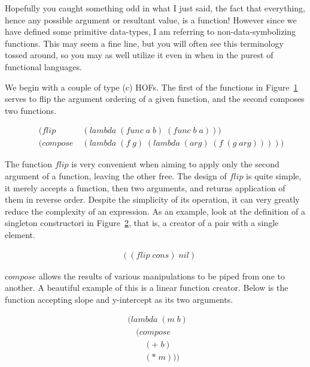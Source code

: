 Hopefully you caught something odd in what I just said, the fact that everything, 
hence any possible argument or resultant value, is a function! However since we 
have defined some primitive data-types, I am referring to non-data-symbolizing 
functions. This may seem a fine line, but you will often see this terminology 
tossed around, so you may as well utilize it even in when in the purest of 
functional languages.

We begin with a couple of type (c) HOFs. The first of the functions in
Figure~\ref{fig:flipAndCompose} serves to flip the argument ordering of a given
function, and the second composes two functions.  

\begin{figure}[htp]
\caption{}\label{fig:flipAndCompose}
\begin{align*}
& (flip \; &(lambda \; (func \; a \; b) \; (func \; b \; a))) \; 
\\& (compose \; &(lambda \; (f \; g) \; (lambda \; (arg) \; (f \; (g \; arg))))) \; 
\end{align*}
\end{figure}

The function $flip$ is very convenient when aiming to apply only the second
argument of a function, leaving the other free. The design of $flip$ is quite
simple, it merely accepts a function, then two arguments, and returns
application of them in reverse order. Despite the simplicity of its operation,
it can very greatly reduce the complexity of an expression. As an example, look
at the definition of a singleton constructori in
Figure~\ref{fig:singletonConstructor}, that is, a creator of a pair with a
single element.

\begin{figure}[htp]
\caption{}\label{fig:singletonConstructor}
\begin{align*}
& ((flip \; cons) \; nil)
\end{align*}
\end{figure}


$compose$ allows the results of various manipulations to be piped from one to 
another. A beautiful example of this is a linear function creator. Below is the 
function accepting slope and y-intercept as its two arguments.

\begin{figure}[htp]
\caption{}\label{fig:linearFuncGen}
\begin{align*}
& (lambda \; (m \; b) \; 
\\& \quad (compose \; 
\\& \qquad (+ \; b) \; 
\\& \qquad (* \; m)))
\end{align*}
\end{figure}

